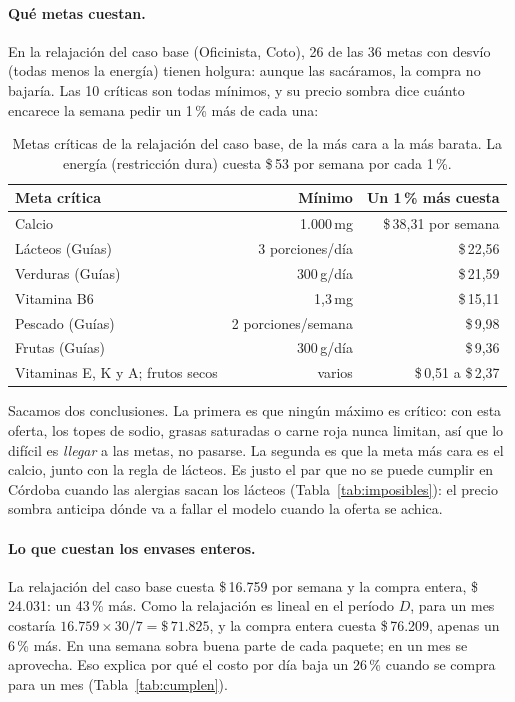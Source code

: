 \documentclass[10pt,a4paper]{article}
\newcommand{\pesos}[1]{\$\,#1}
\begin{document}
\paragraph{Qué metas cuestan.} En la relajación del caso base (Oficinista, Coto),
26 de las 36 metas con desvío (todas menos la energía) tienen holgura: aunque las
sacáramos, la compra no bajaría. Las 10 críticas son todas mínimos, y su precio
sombra dice cuánto encarece la semana pedir un 1\,\% más de cada una:

\begin{table}[H]
\centering\small
\caption{Metas críticas de la relajación del caso base, de la más cara a la más
barata. La energía (restricción dura) cuesta \pesos{53} por semana por cada 1\,\%.}
\label{tab:sombra}
\begin{tabular}{lrr}
\toprule
\textbf{Meta crítica} & \textbf{Mínimo} & \textbf{Un 1\,\% más cuesta} \\
\midrule
Calcio                      & 1.000\,mg        & \pesos{38,31} por semana \\
Lácteos (Guías)             & 3 porciones/día  & \pesos{22,56} \\
Verduras (Guías)            & 300\,g/día       & \pesos{21,59} \\
Vitamina B6                 & 1,3\,mg          & \pesos{15,11} \\
Pescado (Guías)             & 2 porciones/semana & \pesos{9,98} \\
Frutas (Guías)              & 300\,g/día       & \pesos{9,36} \\
Vitaminas E, K y A; frutos secos & varios     & \pesos{0,51} a \pesos{2,37} \\
\bottomrule
\end{tabular}
\end{table}

Sacamos dos conclusiones. La primera es que ningún máximo es crítico: con esta
oferta, los topes de sodio, grasas saturadas o carne roja nunca limitan, así que lo
difícil es \emph{llegar} a las metas, no pasarse. La segunda es que la meta más cara
es el calcio, junto con la regla de lácteos. Es justo el par que no se puede cumplir
en Córdoba cuando las alergias sacan los lácteos (Tabla~\ref{tab:imposibles}): el
precio sombra anticipa dónde va a fallar el modelo cuando la oferta se achica.

\paragraph{Lo que cuestan los envases enteros.} La relajación del caso base cuesta
\pesos{16.759} por semana y la compra entera, \pesos{24.031}: un 43\,\% más. Como la
relajación es lineal en el período $D$, para un mes costaría
$16.759 \times 30/7 = \pesos{71.825}$, y la compra entera cuesta \pesos{76.209},
apenas un 6\,\% más. En una semana sobra buena parte de cada paquete; en un mes se
aprovecha. Eso explica por qué el costo por día baja un 26\,\% cuando se compra para
un mes (Tabla~\ref{tab:cumplen}).
\end{document}
